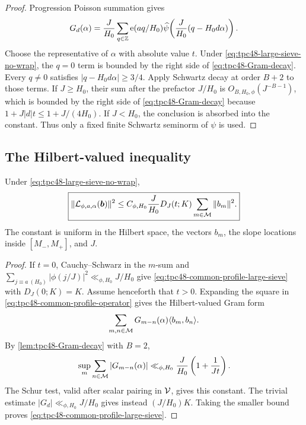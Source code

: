 \begin{proof}
Progression Poisson summation gives
\begin{equation}
 G_d(\alpha)
 =\frac{J}{H_0}\sum_{q\in\mathbb Z}
 \mathrm e(aq/H_0)
 \widehat\psi\!\left(
 \frac{J}{H_0}(q-H_0d\alpha)
 \right).
 \label{eq:tpc48-Gram-Poisson}
\end{equation}
Choose the representative of \(\alpha\) with absolute value \(t\).
Under \eqref{eq:tpc48-large-sieve-no-wrap}, the \(q=0\) term is
bounded by the right side of \eqref{eq:tpc48-Gram-decay}.  Every
\(q\ne0\) satisfies \(|q-H_0d\alpha|\ge3/4\).  Apply Schwartz decay at
order \(B+2\) to those terms.  If \(J\ge H_0\), their sum after the
prefactor \(J/H_0\) is \(O_{B,H_0,\phi}(J^{-B-1})\), which is bounded
by the right side of \eqref{eq:tpc48-Gram-decay} because
\(1+J|d|t\le1+J/(4H_0)\).  If \(J<H_0\), the conclusion is absorbed
into the constant.  Thus only a fixed finite Schwartz seminorm of
\(\psi\) is used.
\end{proof}

\subsection{The Hilbert-valued inequality}

\begin{theorem}
\label{thm:tpc48-common-profile-large-sieve}
Under \eqref{eq:tpc48-large-sieve-no-wrap},
\begin{equation}
 \boxed{
 \|\mathcal L_{\phi,a,\alpha}(\bm b)\|^2
 \le C_{\phi,H_0}\frac{J}{H_0}
 D_J(t;K)\sum_{m\in\mathcal M}\|b_m\|^2.}
 \label{eq:tpc48-common-profile-large-sieve}
\end{equation}
The constant is uniform in the Hilbert space, the vectors \(b_m\),
the slope locations inside \([M_-,M_+]\), and \(J\).
\end{theorem}

\begin{proof}
If \(t=0\), Cauchy--Schwarz in the \(m\)-sum and
\(\sum_{j\equiv a\ (H_0)}|\phi(j/J)|^2\ll_{\phi,H_0}J/H_0\)
give \eqref{eq:tpc48-common-profile-large-sieve} with
\(D_J(0;K)=K\).  Assume henceforth that \(t>0\).
Expanding the square in \eqref{eq:tpc48-common-profile-operator} gives
the Hilbert-valued Gram form
\begin{equation}
 \sum_{m,n\in\mathcal M}
 G_{m-n}(\alpha)\langle b_m,b_n\rangle.
 \label{eq:tpc48-Gram-form}
\end{equation}
By \cref{lem:tpc48-Gram-decay} with \(B=2\),
\begin{equation}
 \sup_m\sum_{n\in\mathcal M}|G_{m-n}(\alpha)|
 \ll_{\phi,H_0}\frac{J}{H_0}
 \left(1+\frac1{Jt}\right).
 \label{eq:tpc48-Gram-row-sum}
\end{equation}
The Schur test, valid after scalar pairing in \(\mathcal V\), gives this
constant.  The trivial estimate
\(|G_d|\ll_{\phi,H_0}J/H_0\) gives instead
\((J/H_0)K\).  Taking the smaller bound proves
\eqref{eq:tpc48-common-profile-large-sieve}.
\end{proof}

